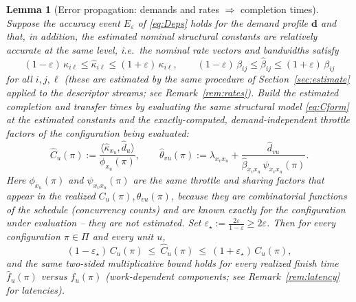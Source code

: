 \documentclass{amsart}
\newtheorem{lemma}{Lemma}
\theoremstyle{definition}
\newcommand{\Chat}{\widehat{C}}
\begin{document}
\begin{lemma}[Error propagation: demands and rates $\Rightarrow$ completion times]\label{lem:propagate}
Suppose the accuracy event $E_\varepsilon$ of \eqref{eq:Deps} holds for the
demand profile $\mathbf d$ and that, in addition, the estimated nominal
structural constants are relatively accurate at the same level, i.e.\ the
nominal rate vectors and bandwidths satisfy
\begin{equation}\label{eq:rateacc}
(1-\varepsilon)\,\kappa_{i\ell}\le\widehat\kappa_{i\ell}\le(1+\varepsilon)\,\kappa_{i\ell},
\qquad
(1-\varepsilon)\,\beta_{ij}\le\widehat\beta_{ij}\le(1+\varepsilon)\,\beta_{ij}
\end{equation}
for all $i,j,\ell$ (these are estimated by the same procedure of
Section~\ref{sec:estimate} applied to the descriptor streams; see
Remark~\ref{rem:rates}). Build the estimated completion and transfer times by
evaluating the \emph{same} structural model \eqref{eq:Cform} at the estimated
constants \emph{and the exactly-computed, demand-independent throttle factors of
the configuration being evaluated}:
\[
\Chat_u(\pi):=\frac{\langle\widehat\kappa_{x_u},\widehat d_u\rangle}{\phi_{x_u}(\pi)},
\qquad
\widehat\theta_{vu}(\pi):=\lambda_{x_vx_u}+\frac{\widehat d_{vu}}
{\widehat\beta_{x_vx_u}\,\psi_{x_vx_u}(\pi)} .
\]
Here $\phi_{x_u}(\pi)$ and $\psi_{x_vx_u}(\pi)$ are the \emph{same} throttle and
sharing factors that appear in the realized $C_u(\pi),\theta_{vu}(\pi)$, because
they are combinatorial functions of the schedule (concurrency counts) and are
known exactly for the configuration under evaluation -- they are \emph{not}
estimated. Set $\varepsilon_\star:=\tfrac{2\varepsilon}{1-\varepsilon}\ge2\varepsilon$.
Then for every configuration $\pi\in\Pi$ and every unit $u$,
\begin{equation}\label{eq:Ceps}
(1-\varepsilon_\star)\,C_u(\pi)\ \le\ \Chat_u(\pi)\ \le\ (1+\varepsilon_\star)\,C_u(\pi),
\end{equation}
and the same two-sided multiplicative bound holds for every realized finish time
$\widehat f_u(\pi)$ versus $f_u(\pi)$ (work-dependent components; see
Remark~\ref{rem:latency} for latencies).
\end{lemma}
\end{document}
